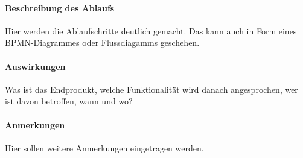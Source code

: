 \documentclass[10pt,a4paper]{article}
\begin{document}
    \paragraph{Beschreibung des Ablaufs}
    Hier werden die Ablaufschritte deutlich gemacht. Das kann auch 
    in Form eines BPMN-Diagrammes oder Flussdiagamms geschehen.
    \paragraph{Auswirkungen}
    Was ist das Endprodukt, welche Funktionalität wird danach 
    angesprochen, wer ist davon betroffen, wann und wo?
    \paragraph{Anmerkungen}
    Hier sollen weitere Anmerkungen eingetragen werden.
\end{document}
